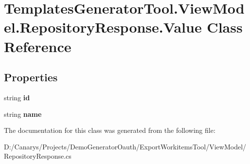 \hypertarget{class_templates_generator_tool_1_1_view_model_1_1_repository_response_1_1_value}{}\section{Templates\+Generator\+Tool.\+View\+Model.\+Repository\+Response.\+Value Class Reference}
\label{class_templates_generator_tool_1_1_view_model_1_1_repository_response_1_1_value}
\subsection*{Properties}
\begin{DoxyCompactItemize}
\item 
\mbox{\label{class_templates_generator_tool_1_1_view_model_1_1_repository_response_1_1_value_a0547a6060aa8fe67095fe830311ee2ba}} 
string {\bfseries id}
\item 
\mbox{\label{class_templates_generator_tool_1_1_view_model_1_1_repository_response_1_1_value_afde66aac0587f278ab01da21e25e8a8f}} 
string {\bfseries name}
\end{DoxyCompactItemize}


The documentation for this class was generated from the following file\+:\begin{DoxyCompactItemize}
\item 
D\+:/\+Canarys/\+Projects/\+Demo\+Generator\+Oauth/\+Export\+Workitems\+Tool/\+View\+Model/Repository\+Response.\+cs\end{DoxyCompactItemize}

